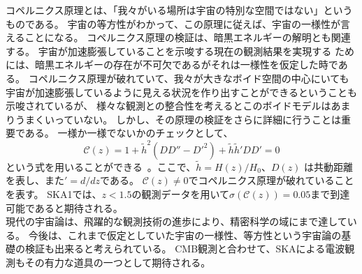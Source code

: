 コペルニクス原理とは、「我々がいる場所は宇宙の特別な空間ではない」というものである。
宇宙の等方性がわかって、この原理に従えば、宇宙の一様性が言えることになる。
コペルニクス原理の検証は、暗黒エネルギーの解明とも関連する。
宇宙が加速膨張していることを示唆する現在の観測結果を実現する
ためには、暗黒エネルギーの存在が不可欠であるがそれは一様性を仮定した時である。
コペルニクス原理が破れていて、我々が大きなボイド空間の中心にいても
宇宙が加速膨張しているように見える状況を作り出すことができるということも示唆されているが、
様々な観測との整合性を考えるとこのボイドモデルはあまりうまくいっていない。
しかし、その原理の検証をさらに詳細に行うことは重要である。
一様か一様でないかのチェックとして、
\begin{equation}
{\mathcal C}(z) = 1 + \widetilde h^2\left( DD'' - {D'}^2\right) + \widetilde h\widetilde h' DD' = 0
\end{equation}
という式を用いることができる~\citep{Clarkson:2007pz}。ここで、$\widetilde h= H(z) / H_0 $、$D(z)$
は共動距離を表し、また$' = d/dz$である。
${\mathcal C}(z) \neq 0$でコペルニクス原理が破れていることを表す。
SKA1では、$z<1.5$の観測データを用いて$\sigma ({\mathcal C}(z)) =0.05$まで到達可能であると期待される。
\\

現代の宇宙論は、飛躍的な観測技術の進歩により、精密科学の域にまで達している。
今後は、これまで仮定としていた宇宙の一様性、等方性という宇宙論の基礎の検証も出来ると考えられている。
CMB観測と合わせて、SKAによる電波観測もその有力な道具の一つとして期待される。



